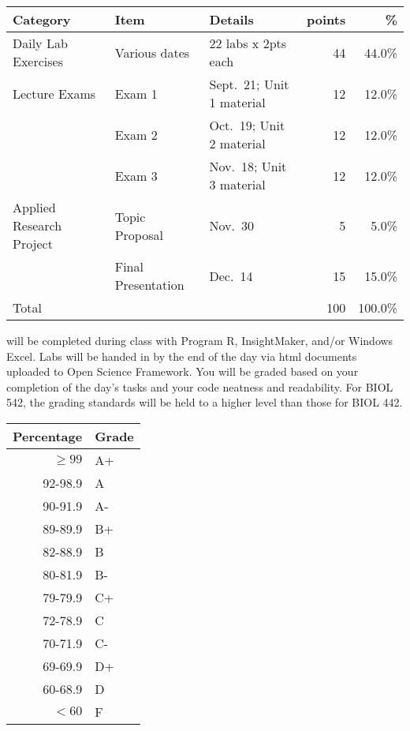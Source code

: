 \documentclass{tufte-handout}
\begin{document}

\begin{fullwidth}



\begin{table}
\begin{tabular}{l l l r r}
Category & Item & Details & points & \% \\
\hline
Daily Lab Exercises & Various dates & 22 labs x 2pts each & 44 & 44.0\% \\
\hline
Lecture Exams & Exam 1 & Sept.~21; Unit 1 material & 12 & 12.0\% \\
& Exam 2 & Oct.~19; Unit 2 material & 12 & 12.0\% \\
& Exam 3 & Nov.~18; Unit 3 material & 12 & 12.0\% \\ 		
\hline
Applied Research Project & Topic Proposal & Nov.~30 & 5 & 5.0\% \\
& Final Presentation & Dec.~14 & 15 & 15.0\% \\
\hline
Total & & & 100 & 100.0\% 
\end{tabular}
\end{table}

\end{fullwidth}

 will be completed during class with Program R, InsightMaker, and/or Windows Excel. Labs will be handed in by the end of the day via html documents uploaded to Open Science Framework. You will be graded based on your completion of the day's tasks and your code neatness and readability. For BIOL 542, the grading standards will be held to a higher level than those for BIOL 442. 



\begin{margintable}
\begin{tabular}{rl}
Percentage & Grade \\
\hline 
$\ge99$ & A+ \\
92-98.9 & A \\
90-91.9 & A- \\
89-89.9 & B+ \\
82-88.9 & B \\
80-81.9 & B- \\
79-79.9 & C+ \\
72-78.9 & C \\
70-71.9 & C- \\
69-69.9 & D+ \\
60-68.9 & D \\
$<60$ & F \\
\hline
\end{tabular}
\end{margintable}
\end{document}
